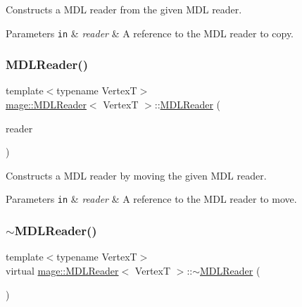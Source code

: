Constructs a M\+DL reader from the given M\+DL reader.


\begin{DoxyParams}[1]{Parameters}
\mbox{\tt in}  & {\em reader} & A reference to the M\+DL reader to copy. \\
\hline
\end{DoxyParams}
\hypertarget{classmage_1_1_m_d_l_reader_a6713aaf2b32b53e45dd2eead538d94dd}{}\label{classmage_1_1_m_d_l_reader_a6713aaf2b32b53e45dd2eead538d94dd} 
\subsubsection{\texorpdfstring{M\+D\+L\+Reader()}{MDLReader()}\hspace{0.1cm}{\footnotesize\ttfamily [3/3]}}
{\footnotesize\ttfamily template$<$typename VertexT$>$ \\
\hyperlink{classmage_1_1_m_d_l_reader}{mage\+::\+M\+D\+L\+Reader}$<$ VertexT $>$\+::\hyperlink{classmage_1_1_m_d_l_reader}{M\+D\+L\+Reader} (\begin{DoxyParamCaption}\item[{\hyperlink{classmage_1_1_m_d_l_reader}{M\+D\+L\+Reader}$<$ VertexT $>$ \&\&}]{reader }\end{DoxyParamCaption})}

Constructs a M\+DL reader by moving the given M\+DL reader.


\begin{DoxyParams}[1]{Parameters}
\mbox{\tt in}  & {\em reader} & A reference to the M\+DL reader to move. \\
\hline
\end{DoxyParams}
\hypertarget{classmage_1_1_m_d_l_reader_ae1e784f0c7449a2a34ffb90badc3d2da}{}\label{classmage_1_1_m_d_l_reader_ae1e784f0c7449a2a34ffb90badc3d2da} 
\subsubsection{\texorpdfstring{$\sim$\+M\+D\+L\+Reader()}{~MDLReader()}}
{\footnotesize\ttfamily template$<$typename VertexT$>$ \\
virtual \hyperlink{classmage_1_1_m_d_l_reader}{mage\+::\+M\+D\+L\+Reader}$<$ VertexT $>$\+::$\sim$\hyperlink{classmage_1_1_m_d_l_reader}{M\+D\+L\+Reader} (\begin{DoxyParamCaption}{ }\end{DoxyParamCaption})\hspace{0.3cm}{\ttfamily [virtual]}}


